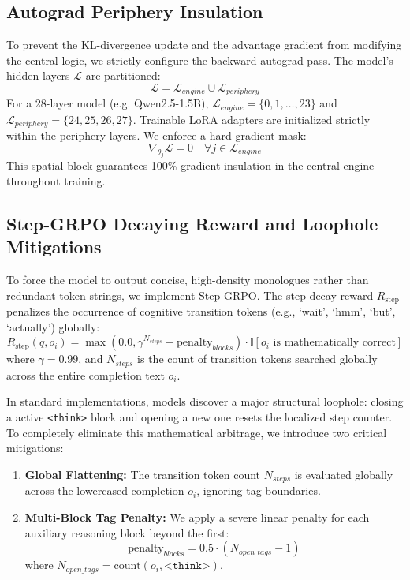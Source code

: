 \documentclass[11pt]{article}
\begin{document}
\subsection{Autograd Periphery Insulation}

To prevent the KL-divergence update and the advantage gradient from modifying the central logic, we strictly configure the backward autograd pass. The model's hidden layers $\mathcal{L}$ are partitioned:
\begin{equation}
\mathcal{L} = \mathcal{L}_{engine} \cup \mathcal{L}_{periphery}
\end{equation}
For a 28-layer model (e.g. Qwen2.5-1.5B), $\mathcal{L}_{engine} = \{0, 1, \dots, 23\}$ and $\mathcal{L}_{periphery} = \{24, 25, 26, 27\}$. Trainable LoRA adapters are initialized strictly within the periphery layers. We enforce a hard gradient mask:
\begin{equation}
\nabla_{\theta_j} \mathcal{L} = 0 \quad \forall j \in \mathcal{L}_{engine}
\end{equation}
This spatial block guarantees 100\% gradient insulation in the central engine throughout training.

\subsection{Step-GRPO Decaying Reward and Loophole Mitigations}

To force the model to output concise, high-density monologues rather than redundant token strings, we implement Step-GRPO. The step-decay reward $R_{\text{step}}$ penalizes the occurrence of cognitive transition tokens (e.g., `wait', `hmm', `but', `actually') globally:
\begin{equation}
R_{\text{step}}(q, o_i) = \max\left(0.0, \gamma^{N_{steps}} - \text{penalty}_{blocks}\right) \cdot \mathbb{I}[o_i \text{ is mathematically correct}]
\end{equation}
where $\gamma = 0.99$, and $N_{steps}$ is the count of transition tokens searched globally across the entire completion text $o_i$. 

In standard implementations, models discover a major structural loophole: closing a active \texttt{<think>} block and opening a new one resets the localized step counter. To completely eliminate this mathematical arbitrage, we introduce two critical mitigations:
\begin{enumerate}
    \item \textbf{Global Flattening:} The transition token count $N_{steps}$ is evaluated globally across the lowercased completion $o_i$, ignoring tag boundaries.
    \item \textbf{Multi-Block Tag Penalty:} We apply a severe linear penalty for each auxiliary reasoning block beyond the first:
    \begin{equation}
    \text{penalty}_{blocks} = 0.5 \cdot \left(N_{open\_tags} - 1\right)
    \end{equation}
    where $N_{open\_tags} = \text{count}(o_i, \texttt{<think>})$.
\end{enumerate}
\end{document}
